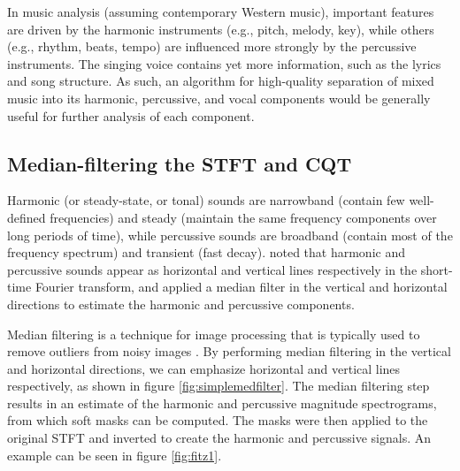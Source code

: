 \documentclass[letter,12pt]{article}
\begin{document}
In music analysis (assuming contemporary Western music), important features are driven by the harmonic instruments (e.g., pitch, melody, key), while others (e.g., rhythm, beats, tempo) are influenced more strongly by the percussive instruments. The singing voice contains yet more information, such as the lyrics and song structure. As such, an algorithm for high-quality separation of mixed music into its harmonic, percussive, and vocal components would be generally useful for further analysis of each component.

\subsection{Median-filtering the STFT and CQT}

Harmonic (or steady-state, or tonal) sounds are narrowband (contain few well-defined frequencies) and steady (maintain the same frequency components over long periods of time), while percussive sounds  are broadband (contain most of the frequency spectrum) and transient (fast decay). \citet{fitzgerald1} noted that harmonic and percussive sounds appear as horizontal and vertical lines respectively in the short-time Fourier transform, and applied a median filter in the vertical and horizontal directions to estimate the harmonic and percussive components.

Median filtering is a technique for image processing that is typically used to remove outliers from noisy images \cite{imagenoise}. By performing median filtering in the vertical and horizontal directions, we can emphasize horizontal and vertical lines respectively, as shown in figure \ref{fig:simplemedfilter}. The median filtering step results in an estimate of the harmonic and percussive magnitude spectrograms, from which soft masks can be computed. The masks were then applied to the original STFT and inverted to create the harmonic and percussive signals. An example can be seen in figure \ref{fig:fitz1}.
\end{document}

